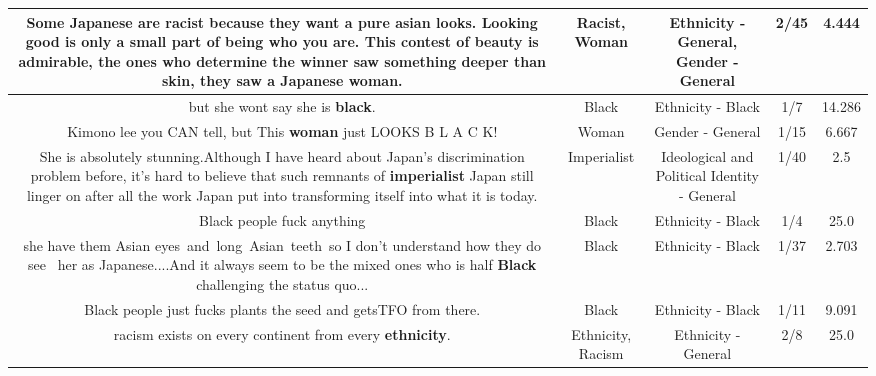 \documentclass[11pt]{article}
\newlength\mylength
\begin{document}
\begin{center}
\begin{longtable}{|C{.65\mylength}|C{.30\mylength}|C{.12\mylength}|C{.12\mylength}|C{.12\mylength}|}
  \small Some Japanese are \textbf{racist} because they want a pure asian looks. Looking good is only a small part of being who you are.  This contest of beauty is admirable, the ones who determine the winner saw something deeper than skin, they saw a Japanese \textbf{woman}.\normalsize   & Racist, Woman & Ethnicity - General, Gender - General & 2/45 & 4.444 \\  \hline
  \small but she wont say she is \textbf{black}.\normalsize   & Black & Ethnicity - Black & 1/7 & 14.286 \\  \hline
  \small Kimono lee you CAN tell, but This \textbf{woman} just LOOKS B L A C K!\normalsize   & Woman & Gender - General & 1/15 & 6.667 \\  \hline
  \small She is absolutely stunning.Although I have heard about Japan's discrimination problem before, it's hard to believe that such remnants of \textbf{imperialist} Japan still linger on after all the work Japan put into transforming itself into what it is today.\normalsize   & Imperialist &  Ideological and Political Identity - General & 1/40 & 2.5 \\  \hline
  \small Black people fuck anything\normalsize   & Black & Ethnicity - Black & 1/4 & 25.0 \\  \hline
  \small she have them Asian eyes and long Asian teeth so I don't understand how they do see  her as Japanese....And it always seem to be the mixed ones who is half \textbf{Black} challenging the status quo...\normalsize   & Black & Ethnicity - Black & 1/37 & 2.703 \\  \hline
  \small Black people just fucks plants the seed and getsTFO from there.\normalsize   & Black & Ethnicity - Black & 1/11 & 9.091 \\  \hline
  \small racism exists on every continent from every \textbf{ethnicity}.\normalsize   & Ethnicity, Racism & Ethnicity - General & 2/8 & 25.0 \\  \hline

\end{longtable}
\end{center}
\end{document}
